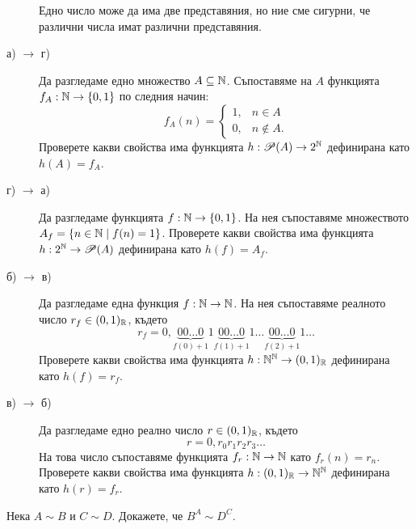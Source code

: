\begin{hint}
\begin{description}
    Едно число може да има две представяния, но ние сме сигурни, че различни числа имат различни представяния.
  \item[а) $\rightarrow$ г)]
    Да разгледаме едно множество $A \subseteq \mathbb{N}$.
    Съпоставяме на $A$ функцията $f_A:\mathbb{N} \to \{0,1\}$  по следния начин:
    \[
    f_A(n) = 
    \begin{cases}
      1, & n \in A\\
      0, & n\not\in A.
    \end{cases}
    \]
    Проверете какви свойства има функцията $h:\mathscr{P}(A) \to 2^{\mathbb{N}}$ дефинирана като $h(A) = f_A$.
  \item[г) $\rightarrow$ а)]
    Да разгледаме функцията $f:\mathbb{N}\to\{0,1\}$.
    На нея съпоставяме множеството $A_f = \{n \in \mathbb{N} \mid f(n) = 1\}$.
    Проверете какви свойства има функцията $h:2^{\mathbb{N}} \to \mathscr{P}(A)$ дефинирана като $h(f) = A_f$.
  \item[б) $\rightarrow$ в)]
    Да разгледаме една функция $f:\mathbb{N}\to\mathbb{N}$.
    На нея съпоставяме реалното число $r_f \in (0,1)_{\mathbb{R}}$, където
    \[r_f = 0,\underbrace{00\dots 0}_{f(0)+1}1\underbrace{00\dots 0}_{f(1)+1}1\dots\underbrace{00\dots 0}_{f(2)+1}1\dots\]
    Проверете какви свойства има функцията $h:\mathbb{N}^{\mathbb{N}} \to (0,1)_{\mathbb{R}}$ дефинирана като $h(f) = r_f$.
  \item[в) $\rightarrow$ б)]
    Да разгледаме едно реално число $r\in (0,1)_{\mathbb{R}}$, където
    \[r = 0, r_0r_1r_2r_3\dots\]
    На това число съпоставяме функцията $f_r:\mathbb{N}\to\mathbb{N}$ като $f_r(n) = r_n$.
    Проверете какви свойства има функцията $h:(0,1)_{\mathbb{R}} \to \mathbb{N}^{\mathbb{N}}$ дефинирана като $h(r) = f_r$.
  \end{description}
\end{hint}

\begin{problem}
  Нека $A \sim B$ и $C \sim D$. Докажете, че $B^A \sim D^C$.
\end{problem}


